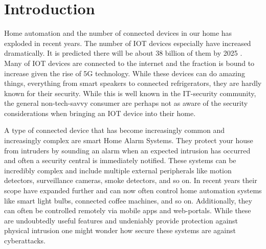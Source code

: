 \chapter{Introduction} \label{ch:intro}
% 
% 
% 


Home automation and the number of connected devices in our home has exploded in recent years. The number of \gls{IOT} devices especially have increased dramatically. It is predicted there will be about 38 billion of them by 2025 \cite{ieee-iot}. Many of \gls{IOT} devices are connected to the internet and the fraction is bound to increase given the rise of 5G technology. While these devices can do amazing things, everything from smart speakers to connected refrigerators, they are hardly known for their security. While this is well known in the IT-security community, the general non-tech-savvy consumer are perhaps not as aware of the security considerations when bringing an \gls{IOT} device into their home.

A type of connected device that has become increasingly common and increasingly complex are smart Home Alarm Systems. They protect your house from intruders by sounding an alarm when an expected intrusion has occurred and often a security central is immediately notified. These systems can be incredibly complex and include multiple external peripherals like motion detectors, surveillance cameras, smoke detectors, and so on. In recent years their scope have expanded further and can now often control home automation systems like smart light bulbs, connected coffee machines, and so on. Additionally, they can often be controlled remotely via mobile apps and web-portals. While these are undoubtedly useful features and undeniably provide protection against physical intrusion one might wonder how secure these systems are against cyberattacks.

